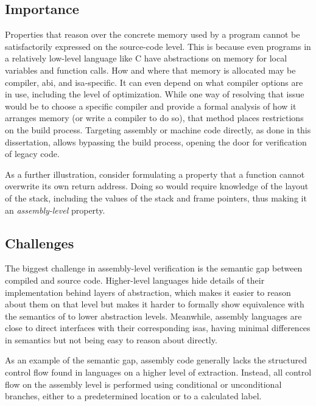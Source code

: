 \subsection{Importance}
Properties that reason over the concrete memory used by a program
cannot be satisfactorily expressed on the source-code level.
This is because even programs in a relatively low-level language like C
have abstractions on memory for local variables and function calls.
How and where that memory is allocated may be compiler, \ac{abi}, and \ac{isa}-specific.
It can even depend on what compiler options are in use,
including the level of optimization.
While one way of resolving that issue would be to choose a specific compiler
and provide a formal analysis of how it arranges memory (or write a compiler to do so),
that method places restrictions on the build process.
Targeting assembly or machine code directly, as done in this dissertation,
allows bypassing the build process, opening the door for verification of legacy code.
\begin{example}\label{ex:rop}
  As a further illustration, consider formulating a property
  that a function cannot overwrite its own return address.
  Doing so would require knowledge of the layout of the stack,
  including the values of the stack and frame pointers,
  thus making it an \emph{assembly-level} property.
\end{example}

\subsection{Challenges}\label{asm_challenges}
The biggest challenge in assembly-level verification is
the semantic gap between compiled and source code.
Higher-level languages hide details of their implementation
behind layers of abstraction, which makes it easier to reason about them on that level
but makes it harder to formally show equivalence with the semantics of
to lower abstraction levels.
Meanwhile, assembly languages are close to direct interfaces
with their corresponding \acp{isa},
having minimal differences in semantics but not being easy to reason about directly.

As an example of the semantic gap,
assembly code generally lacks the structured control flow found in languages
on a higher level of extraction.
Instead, all control flow on the assembly level is performed using conditional
or unconditional branches, either to a predetermined location
or to a calculated label.

